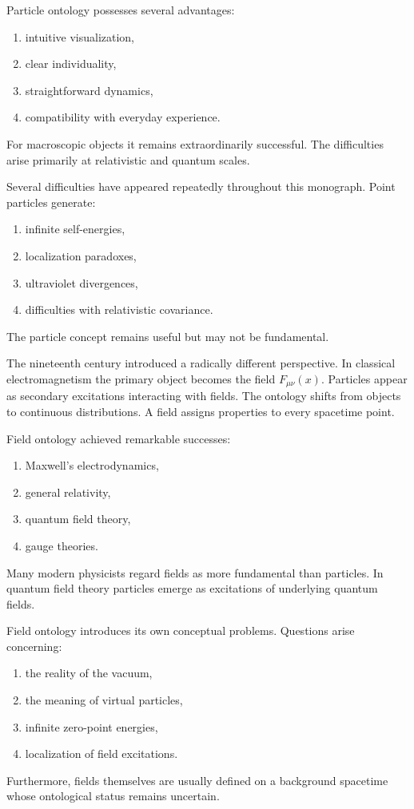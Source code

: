 Particle ontology possesses several advantages:
\begin{enumerate}
\item intuitive visualization,
\item clear individuality,
\item straightforward dynamics,
\item compatibility with everyday experience.
\end{enumerate}
For macroscopic objects it remains extraordinarily successful.
The difficulties arise primarily at relativistic and quantum scales.

Several difficulties have appeared repeatedly throughout this monograph.
Point particles generate:
\begin{enumerate}
\item infinite self-energies,
\item localization paradoxes,
\item ultraviolet divergences,
\item difficulties with relativistic covariance.
\end{enumerate}
The particle concept remains useful but may not be fundamental.

The nineteenth century introduced a radically different perspective.
In classical electromagnetism the primary object becomes the field
$F_{\mu\nu}(x).$
Particles appear as secondary excitations interacting with fields.
The ontology shifts from objects to continuous distributions.
A field assigns properties to every spacetime point.

Field ontology achieved remarkable successes:
\begin{enumerate}
\item Maxwell's electrodynamics,
\item general relativity,
\item quantum field theory,
\item gauge theories.
\end{enumerate}
Many modern physicists regard fields as more fundamental than particles.
In quantum field theory particles emerge as excitations of underlying quantum fields.

Field ontology introduces its own conceptual problems.
Questions arise concerning:
\begin{enumerate}
\item the reality of the vacuum,
\item the meaning of virtual particles,
\item infinite zero-point energies,
\item localization of field excitations.
\end{enumerate}
Furthermore, fields themselves are usually defined on a background spacetime
whose ontological status remains uncertain.

